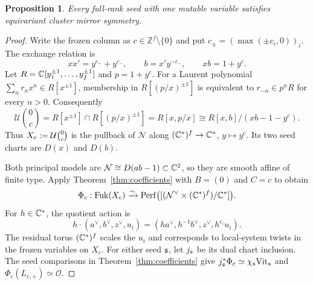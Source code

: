 \documentclass[12pt, letter]{amsart}
\newtheorem{proposition}[theorem]{Proposition}
\theoremstyle{definition}
\newcommand{\Z}{\mathbb Z}
\newcommand{\OO}{\mathcal O}
\newcommand{\U}{\mathscr U}
\newcommand{\Nn}{\mathcal N}
\numberwithin{equation}{section}
\begin{document}
\begin{proposition}\label{prop:node-rank-one}
Every full-rank seed with one mutable variable satisfies
equivariant cluster mirror symmetry.
\end{proposition}
\begin{proof}
Write the frozen column as $c\in\Z^f\setminus\{0\}$ and put
$c_\pm=(\max(\pm c_i,0))_i$. The exchange relation is
\[
 xx'=y^{c_+}+y^{c_-},\qquad b=x'y^{-c_-},\qquad xb=1+y^c.
\]
Let $R=\mathbb C[y_1^{\pm1},\ldots,y_f^{\pm1}]$ and $p=1+y^c$.
For a Laurent polynomial $\sum_n r_nx^n\in R[x^{\pm1}]$, membership in
$R[(p/x)^{\pm1}]$ is equivalent to $r_{-n}\in p^nR$ for every $n>0$.
Consequently
\[
 \U\binom0c=R[x^{\pm1}]\cap R[(p/x)^{\pm1}]
 =R[x,p/x]\cong R[x,b]/(xb-1-y^c).
\]
Thus $X_c:=\mathcal{U}\binom0c$ is the pullback of $\Nn$
along $(\mathbb C^*)^f\to\mathbb C^*$, $y\mapsto y^c$.
Its two seed charts are $D(x)$ and $D(b)$.

Both principal models are $\Nn\cong D(ab-1)\subset\C^2$,
so they are smooth affine of finite type.
Apply Theorem~\ref{thm:coefficients} with $B=(0)$ and $C=c$ to obtain
\[
 \Phi_c:\Fuk(X_c)\xrightarrow{\sim}
 \Perf\bigl([(\Nn^\vee\times(\C^*)^f)/\C^*]\bigr).
\]
For $h\in\mathbb C^*$, the quotient action is
\[
 h\cdot(a^\vee,b^\vee,z^\vee,u_i)
 =(ha^\vee,h^{-1}b^\vee,z^\vee,h^{c_i}u_i).
\]
The residual torus $(\mathbb C^*)^f$ scales the $u_i$ and corresponds to
local-system twists in the frozen variables on $X_c$.
For either seed $\mathfrak{s}$, let $j_{\mathfrak{s}}$ be its dual chart inclusion.
The seed comparisons in Theorem~\ref{thm:coefficients} give
$j_{\mathfrak{s}}^*\Phi_c\simeq\chi_{\mathfrak{s}}\mathrm{Vit}_{\mathfrak{s}}$ and $
 \Phi_c(L_{c,+})\simeq\OO$.
\end{proof}
\end{document}
